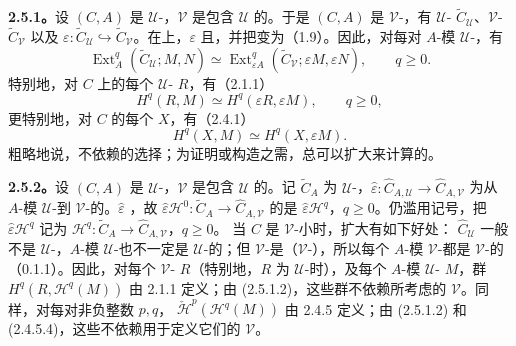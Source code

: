 \textbf{2.5.1。}设 $(C,A)$ 是 $\mathcal U$-，$\mathcal V$ 是包含 $\mathcal U$ 的。于是 $(C,A)$ 是 $\mathcal V$-，有 $\mathcal U$- $\widetilde C_{\mathcal U}$、$\mathcal V$- $\widetilde C_{\mathcal V}$ 以及 $\varepsilon:\widetilde C_{\mathcal U}\hookrightarrow\widetilde C_{\mathcal V}$。在上，$\varepsilon$ 且，并把变为（1.9）。因此，对每对 $A$-模 $\mathcal U$-，有
\[
 \operatorname{Ext}_A^q(\widetilde C_{\mathcal U};M,N)
 \simeq\operatorname{Ext}_{\varepsilon A}^q(\widetilde C_{\mathcal V};\varepsilon M,\varepsilon N),
 \qquad q\geq0.\tag{2.5.1.1}
\]
特别地，对 $C$ 上的每个 $\mathcal U$- $R$，有（2.1.1）
\[
 H^q(R,M)\simeq H^q(\varepsilon R,\varepsilon M),\qquad q\geq0,\tag{2.5.1.2}
\]
更特别地，对 $C$ 的每个 $X$，有（2.4.1）
\[
 H^q(X,M)\simeq H^q(X,\varepsilon M).\tag{2.5.1.3}
\]
粗略地说，不依赖的选择；为证明或构造之需，总可以扩大来计算的。

\textbf{2.5.2。}设 $(C,A)$ 是 $\mathcal U$-，$\mathcal V$ 是包含 $\mathcal U$ 的。记 $\widetilde C_A$ 为 $\mathcal U$-，$\widehat\varepsilon:\widehat C_{A,\mathcal U}\to\widehat C_{A,\mathcal V}$ 为从 $A$-模 $\mathcal U$-到 $\mathcal V$-的。$\widehat\varepsilon$ ，故
$\widehat\varepsilon\mathscr H^0:\widetilde C_A\to\widehat C_{A,\mathcal V}$
的是 $\widehat\varepsilon\mathscr H^q$，$q\geq0$。仍滥用记号，把 $\widehat\varepsilon\mathscr H^q$ 记为
$\mathscr H^q:\widetilde C_A\to\widehat C_{A,\mathcal V}$，$q\geq0$。
当 $C$ 是 $\mathcal V$-小时，扩大有如下好处： $\widehat C_{\mathcal U}$ 一般不是 $\mathcal U$-，$A$-模 $\mathcal U$-也不一定是 $\mathcal U$-的；但 $\mathcal V$-是（$\mathcal V$-），所以每个 $A$-模 $\mathcal V$-都是 $\mathcal V$-的（0.1.1）。因此，对每个 $\mathcal V$- $R$（特别地，$R$ 为 $\mathcal U$-时），及每个 $A$-模 $\mathcal U$- $M$，群 $H^q(R,\mathscr H^q(M))$ 由 2.1.1 定义；由 (2.5.1.2)，这些群不依赖所考虑的 $\mathcal V$。同样，对每对非负整数 $p,q$， $\check{\mathscr H}^p(\mathscr H^q(M))$ 由 2.4.5 定义；由 (2.5.1.2) 和 (2.4.5.4)，这些不依赖用于定义它们的 $\mathcal V$。

